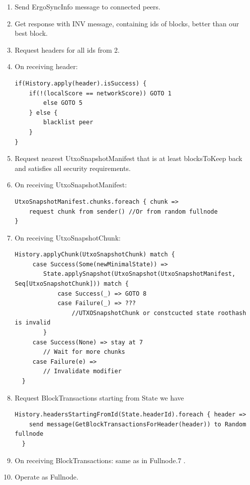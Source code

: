 \documentclass[]{article}   %
\begin{document}
\begin{enumerate}
\item Send ErgoSyncInfo message to connected peers.
\item Get response with INV message, containing ids of blocks, better than our best block.
\item Request headers for all ids from 2.
\item On receiving header:
\begin{verbatim}
if(History.apply(header).isSuccess) {
    if(!(localScore == networkScore)) GOTO 1
        else GOTO 5
    } else {
        blacklist peer
    }
}
\end{verbatim}

\item Request nearest UtxoSnapshotManifest that is at least blocksToKeep back and satisfies all security requirements.

\item On receiving UtxoSnapshotManifest:

\begin{verbatim}
UtxoSnapshotManifest.chunks.foreach { chunk =>
    request chunk from sender() //Or from random fullnode
}
\end{verbatim}
\item On receiving UtxoSnapshotChunk:
\begin{verbatim}
History.applyChunk(UtxoSnapshotChunk) match {
     case Success(Some(newMinimalState)) =>
        State.applySnapshot(UtxoSnapshot(UtxoSnapshotManifest, Seq[UtxoSnapshotChunk])) match {
            case Success(_) => GOTO 8
            case Failure(_) => ???
                //UTXOSnapshotChunk or constcucted state roothash is invalid
        }
     case Success(None) => stay at 7
        // Wait for more chunks
     case Failure(e) =>
        // Invalidate modifier
  }
\end{verbatim}

\item Request BlockTransactions starting from State we have
\begin{verbatim}
History.headersStartingFromId(State.headerId).foreach { header =>
    send message(GetBlockTransactionsForHeader(header)) to Random fullnode
  }
\end{verbatim}
\item On receiving BlockTransactions: same as in Fullnode.7 .
\item Operate as Fullnode.


\end{enumerate}
\end{document}
